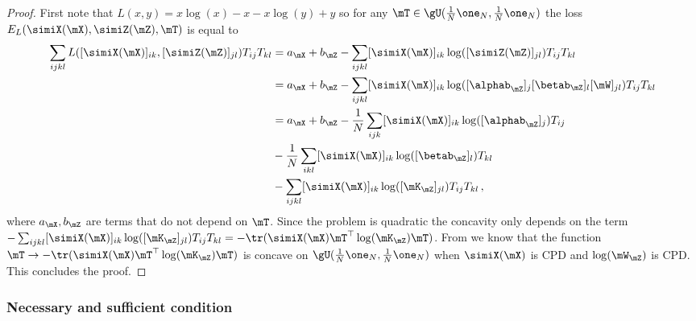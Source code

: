 \begin{proof}
	First note that $L(x,y) = x \log(x)-x - x \log(y) +y$ so for any $\mT \in \gU(\frac{1}{N}\one_N, \frac{1}{N}\one_N)$ the loss $E_{L}(\simiX(\mX), \simiZ(\mZ), \mT)$ is equal to
	\begin{equation}
		\begin{split}
			\sum_{ijkl} L([\simiX(\mX)]_{ik}, [\simiZ(\mZ)]_{jl}) T_{ij} T_{kl} &= a_\mX+ b_\mZ - \sum_{ijkl} [\simiX(\mX)]_{ik}\log([\simiZ(\mZ)]_{jl}) T_{ij} T_{kl} \\
			&=a_\mX+ b_\mZ - \sum_{ijkl} [\simiX(\mX)]_{ik}\log([\alphab_\mZ]_j [\betab_\mZ]_l [\mW]_{jl}) T_{ij} T_{kl} \\
			&=a_\mX+ b_\mZ - \frac{1}{N}\sum_{ijk} [\simiX(\mX)]_{ik}\log([\alphab_\mZ]_j) T_{ij}  \\
			&- \frac{1}{N} \sum_{ikl} [\simiX(\mX)]_{ik}\log([\betab_\mZ]_l) T_{kl}\\
			&-\sum_{ijkl} [\simiX(\mX)]_{ik}\log([\mK_\mZ]_{jl}) T_{ij} T_{kl}\,,
		\end{split}
	\end{equation}
	where $a_\mX, b_\mZ$ are terms that do not depend on $\mT$. Since the problem is quadratic the concavity only depends on the term $-\sum_{ijkl} [\simiX(\mX)]_{ik}\log([\mK_\mZ]_{jl}) T_{ij} T_{kl} = -\tr(\simiX(\mX) \mT^\top \log(\mK_\mZ) \mT)$. From \cite{maron2018probably} we know that the function $\mT \to -\tr(\simiX(\mX) \mT^\top \log(\mK_\mZ) \mT)$ is concave on $\gU(\frac{1}{N} \one_N, \frac{1}{N} \one_N)$ when $\simiX(\mX)$ is CPD and $\log(\mW_\mZ)$ is CPD. This concludes the proof.	
\end{proof}

\subsubsection{Necessary and sufficient condition \label{sec:necessary_and_sufficient}}

